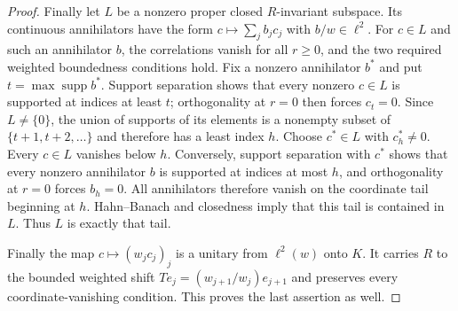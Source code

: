 \begin{proof}
Finally let $L$ be a nonzero proper closed $R$-invariant subspace.
Its continuous annihilators have the form
$c\mapsto\sum_jb_jc_j$ with $b/w\in\ell^2$.
For $c\in L$ and such an annihilator $b$, the correlations vanish for
all $r\geq0$, and the two required weighted boundedness conditions
hold. Fix a nonzero annihilator $b^*$ and put
$t=\max\operatorname{supp}b^*$. Support separation shows that every
nonzero $c\in L$ is supported at indices at least $t$; orthogonality
at $r=0$ then forces $c_t=0$. Since $L\ne\{0\}$, the union of supports
of its elements is a nonempty subset of $\{t+1,t+2,\ldots\}$ and
therefore has a least index $h$. Choose $c^*\in L$ with $c^*_h\ne0$.
Every $c\in L$ vanishes below $h$. Conversely, support separation
with $c^*$ shows that every nonzero annihilator $b$ is supported at
indices at most $h$, and orthogonality at $r=0$ forces $b_h=0$.
All annihilators therefore vanish on the coordinate tail beginning
at $h$. Hahn--Banach and closedness imply that this tail is contained
in $L$. Thus $L$ is exactly that tail.

Finally the map $c\mapsto(w_jc_j)_j$ is a unitary from
$\ell^2(w)$ onto $K$. It carries $R$ to the bounded weighted shift
$Te_j=(w_{j+1}/w_j)e_{j+1}$ and preserves every coordinate-vanishing
condition. This proves the last assertion as well.
\end{proof}
